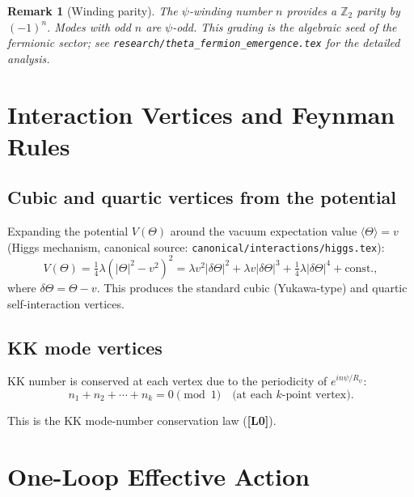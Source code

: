 \documentclass[11pt,a4paper]{article}
\newtheorem{remark}{Remark}
\begin{document}
\begin{remark}[Winding parity]
  The $\psi$-winding number $n$ provides a $\mathbb{Z}_2$ parity by
  $(-1)^n$.  Modes with odd $n$ are $\psi$-odd.  This grading is
  the algebraic seed of the fermionic sector; see
  \texttt{research/theta\_fermion\_emergence.tex} for the detailed analysis.
\end{remark}

\section{Interaction Vertices and Feynman Rules}
\label{sec:vertices}

\subsection{Cubic and quartic vertices from the potential}

Expanding the potential $V(\Theta)$ around the vacuum expectation value
$\langle\Theta\rangle = v$ (Higgs mechanism, canonical source:
\texttt{canonical/interactions/higgs.tex}):
\begin{equation}
  V(\Theta) = \tfrac{1}{4}\lambda(|\Theta|^2 - v^2)^2
  = \lambda v^2 |\delta\Theta|^2 + \lambda v |\delta\Theta|^3
    + \tfrac{1}{4}\lambda |\delta\Theta|^4 + \text{const.},
\end{equation}
where $\delta\Theta = \Theta - v$.  This produces the standard cubic (Yukawa-type)
and quartic self-interaction vertices.

\subsection{KK mode vertices}

KK number is conserved at each vertex due to the periodicity of $e^{in\psi/R_\psi}$:
\begin{equation}
\label{eq:kk_conservation}
  n_1 + n_2 + \cdots + n_k = 0 \pmod{1}
  \quad \text{(at each $k$-point vertex).}
\end{equation}

This is the KK mode-number conservation law (\textbf{[L0]}).

\section{One-Loop Effective Action}
\label{sec:one_loop}
\end{document}
